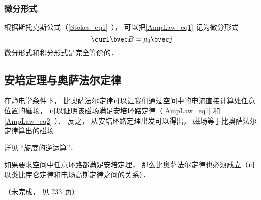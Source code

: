 \subsubsection{微分形式}
根据斯托克斯公式（\autoref{Stokes_eq1}~）， 可以把\autoref{AmpLaw_eq1} 记为微分形式
\begin{equation}\label{AmpLaw_eq2}
\curl \bvec B = \mu_0 \bvec j
\end{equation}
微分形式和积分形式是完全等价的．

\subsection{安培定理与奥萨法尔定律}

在静电学条件下， 比奥萨法尔定律可以让我们通过空间中的电流直接计算处任意位置的磁场， 可以证明该磁场满足安培环路定律（\autoref{AmpLaw_eq1} 和\autoref{AmpLaw_eq2} ）． 反之， 从安培环路定理出发可以得出， 磁场等于比奥萨法尔定律算出的磁场

详见 “旋度的逆运算”．



如果要求空间中任意环路都满足安培定理， 那么比奥萨法尔定律也必须成立（可以类比库仑定律和电场高斯定律之间的关系）．%



（未完成， 见 \cite{GriffE} 233 页）
